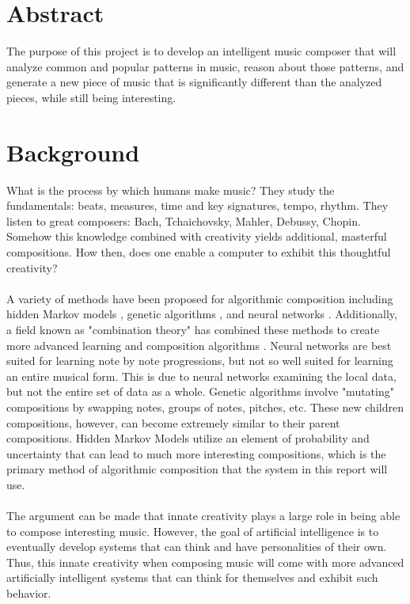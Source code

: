 \documentclass{article}
\begin{document}
\printglossary[title=Terms and Abbreviations,toctile=Terms and Abbreviations]
\newpage

\section{Abstract}
The purpose of this project is to develop an intelligent music composer that will analyze common and popular patterns in music, reason about those patterns, and generate a new piece of music that is significantly different than the analyzed pieces, while still being interesting.

\section{Background}
What is the process by which humans make music? They study the fundamentals: beats, measures, time and key signatures, tempo, rhythm. They listen to great composers: Bach, Tchaichovsky, Mahler, Debussy, Chopin. Somehow this knowledge combined with creativity yields additional, masterful compositions. How then, does one enable a computer to exhibit this thoughtful creativity?\\
\\
A variety of methods have been proposed for algorithmic composition including hidden Markov models \cite{5492670}, genetic algorithms \cite{514161}, and neural networks \cite{4667040}. Additionally, a field known as "combination theory" has combined these methods to create more advanced learning and composition algorithms \cite{4626654}. Neural networks are best suited for learning note by note progressions, but not so well suited for learning an entire musical form. This is due to neural networks examining the local data, but not the entire set of data as a whole. Genetic algorithms involve "mutating" compositions by swapping notes, groups of notes, pitches, etc. These new children compositions, however, can become extremely similar to their parent compositions. Hidden Markov Models utilize an element of probability and uncertainty that can lead to much more interesting compositions, which is the primary method of algorithmic composition that the system in this report will use.\\
\\
The argument can be made that innate creativity plays a large role in being able to compose interesting music.  However, the goal of artificial intelligence is to eventually develop systems that can think and have personalities of their own.  Thus, this innate creativity when composing music will come with more advanced artificially intelligent systems that can think for themselves and exhibit such behavior.
\end{document}
